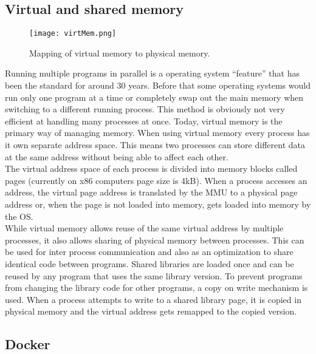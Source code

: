 \documentclass[conference,compsoc,final,a4paper]{IEEEtran}
\begin{document}
\subsection{Virtual and shared memory}
\begin{figure}[!ht]
\centering
\texttt{[image: virtMem.png]}
\caption{Mapping of virtual memory to physical memory. }
\label{virtmem}
\end{figure}
Running multiple programs in parallel is a operating system \enquote{feature} that has been the standard for around 30 years. Before that some operating systems would run only one program at a time or completely swap out the main memory when switching to a different running process. \cite{tanenbaum1997operating} This method is obviously not very efficient at handling many processes at once. Today, virtual memory is the primary way of managing memory. When using virtual memory every process has it own separate address space. This means two processes can store different data at the same address without being able to affect each other. \cite[p.~620]{hennessy2011computer}\\
The virtual address space of each process is divided into memory blocks called pages (currently on x86 computers page size is 4kB). When a process accesses an address, the virtual page address is translated by the \ac{MMU} to a physical page address or, when the page is not loaded into memory, gets loaded into memory by the OS. \\
While virtual memory allows reuse of the same virtual address by multiple processes, it also allows sharing of physical memory between processes. This can be used for inter process communication and also as an optimization to share identical code between programs. Shared libraries are loaded once and can be reused by any program that uses the same library version. \cite{tanenbaum1997operating} To prevent programs from changing the library code for other programs, a copy on write mechanism is used. When a process attempts to write to a shared library page, it is copied in physical memory and the virtual address gets remapped to the copied version.
\subsection{Docker}
\end{document}

